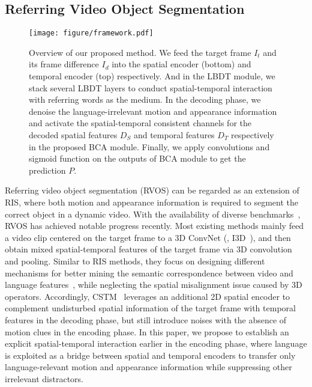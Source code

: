 \documentclass[10pt,twocolumn,letterpaper]{article}
\begin{document}
\subsection{Referring Video Object Segmentation}
\label{sec:related:rvos}

\begin{figure*}[t]
	\centering
		\texttt{[image: figure/framework.pdf]}
	\caption{Overview of our proposed method. We feed the target frame $I_t$ and its frame difference $I_d$ into the spatial encoder (bottom) and temporal encoder (top) respectively. And in the LBDT module, we stack several LBDT layers to conduct spatial-temporal interaction with referring words as the medium. In the decoding phase, we denoise the language-irrelevant motion and appearance information and activate the spatial-temporal consistent channels for the decoded spatial features $D_S$ and temporal features $D_T$ respectively in the proposed BCA module. Finally, we apply convolutions and sigmoid function on the outputs of BCA module to get the prediction $P$.}

	\label{fig:framework}
	
\end{figure*}

Referring video object segmentation (RVOS) can be regarded as an extension of RIS, where both motion and appearance information is required to segment the correct object in a dynamic video.
With the availability of diverse benchmarks~\cite{GavrilyukGLS18,khoreva2018video,seo2020urvos}, RVOS has achieved notable progress recently.
Most existing methods mainly feed a video clip centered on the target frame to a 3D ConvNet (\eg, I3D~\cite{CarreiraZ17}), and then obtain mixed spatial-temporal features of the target frame via 3D convolution and pooling.
Similar to RIS methods, they focus on designing different mechanisms for better mining the semantic correspondence between video and language features~\cite{WangDYT19,ye2021referring,NingXW020,GavrilyukGLS18, WangDMY20,mcintosh2020visual}, while neglecting the spatial misalignment issue caused by 3D operators.
Accordingly, CSTM~\cite{HuiH0DLWH021} leverages an additional 2D spatial encoder to complement undisturbed spatial information of the target frame with temporal features in the decoding phase, but still introduce noises with the absence of motion clues in the encoding phase.
In this paper, we propose to establish an explicit spatial-temporal interaction earlier in the encoding phase, where language is exploited as a bridge between spatial and temporal encoders to transfer only language-relevant motion and appearance information while suppressing other irrelevant distractors.
\end{document}
